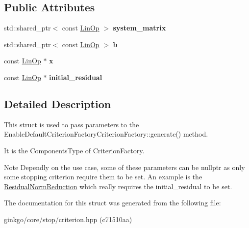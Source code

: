 \subsection*{Public Attributes}
\begin{DoxyCompactItemize}
\item 
\mbox{\label{structgko_1_1stop_1_1CriterionArgs_a2aa22bea76fd64352a446cf6c5570807}} 
std\+::shared\+\_\+ptr$<$ const \hyperlink{classgko_1_1LinOp}{Lin\+Op} $>$ {\bfseries system\+\_\+matrix}
\item 
\mbox{\label{structgko_1_1stop_1_1CriterionArgs_a994457497657a0308c5343e711ec4c3e}} 
std\+::shared\+\_\+ptr$<$ const \hyperlink{classgko_1_1LinOp}{Lin\+Op} $>$ {\bfseries b}
\item 
\mbox{\label{structgko_1_1stop_1_1CriterionArgs_a766a5c79ca77e74703888786e0011a73}} 
const \hyperlink{classgko_1_1LinOp}{Lin\+Op} $\ast$ {\bfseries x}
\item 
\mbox{\label{structgko_1_1stop_1_1CriterionArgs_af7233105d01a9b055b15652daf179a67}} 
const \hyperlink{classgko_1_1LinOp}{Lin\+Op} $\ast$ {\bfseries initial\+\_\+residual}
\end{DoxyCompactItemize}


\subsection{Detailed Description}
This struct is used to pass parameters to the Enable\+Default\+Criterion\+Factory\+Criterion\+Factory\+::generate() method. 

It is the Components\+Type of Criterion\+Factory.

\begin{DoxyNote}{Note}
Dependly on the use case, some of these parameters can be {\ttfamily nullptr} as only some stopping criterion require them to be set. An example is the {\ttfamily \hyperlink{classgko_1_1stop_1_1ResidualNormReduction}{Residual\+Norm\+Reduction}} which really requires the {\ttfamily initial\+\_\+residual} to be set. 
\end{DoxyNote}


The documentation for this struct was generated from the following file\+:\begin{DoxyCompactItemize}
\item 
ginkgo/core/stop/criterion.\+hpp (c71510aa)\end{DoxyCompactItemize}
